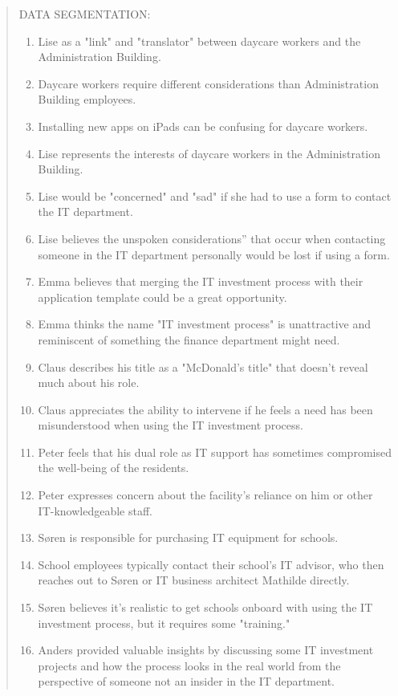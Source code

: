 \documentclass[
]{book}
\begin{document}
\begin{quote}
DATA SEGMENTATION:

\begin{enumerate}
\def\labelenumi{\arabic{enumi}.}
\item
  Lise as a "link" and "translator" between daycare workers and the Administration Building.
\item
  Daycare workers require different considerations than Administration Building employees.
\item
  Installing new apps on iPads can be confusing for daycare workers.
\item
  Lise represents the interests of daycare workers in the Administration Building.
\item
  Lise would be "concerned" and "sad" if she had to use a form to contact the IT department.
\item
  Lise believes the unspoken considerations'' that occur when contacting someone in the IT department personally would be lost if using a form.
\item
  Emma believes that merging the IT investment process with their application template could be a great opportunity.
\item
  Emma thinks the name "IT investment process" is unattractive and reminiscent of something the finance department might need.
\item
  Claus describes his title as a "McDonald's title" that doesn't reveal much about his role.
\item
  Claus appreciates the ability to intervene if he feels a need has been misunderstood when using the IT investment process.
\item
  Peter feels that his dual role as IT support has sometimes compromised the well-being of the residents.
\item
  Peter expresses concern about the facility's reliance on him or other IT-knowledgeable staff.
\item
  Søren is responsible for purchasing IT equipment for schools.
\item
  School employees typically contact their school's IT advisor, who then reaches out to Søren or IT business architect Mathilde directly.
\item
  Søren believes it's realistic to get schools onboard with using the IT investment process, but it requires some "training."
\item
  Anders provided valuable insights by discussing some IT investment projects and how the process looks in the real world from the perspective of someone not an insider in the IT department.

\end{enumerate}
\end{quote}
\end{document}
